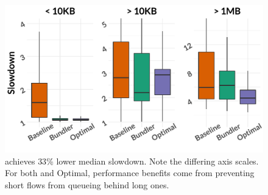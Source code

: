 \begin{figure}
    \centering
\begin{knitrout}
\color{fgcolor}
\includegraphics[width=\maxwidth]{figure/eval:best-1} 

\end{knitrout}
    \caption{\name achieves $33$\% lower median slowdown. Note the differing axis scales. For both \name and Optimal, performance benefits come from preventing short flows from queueing behind long ones. }
    \label{fig:eval:best}
\end{figure}
